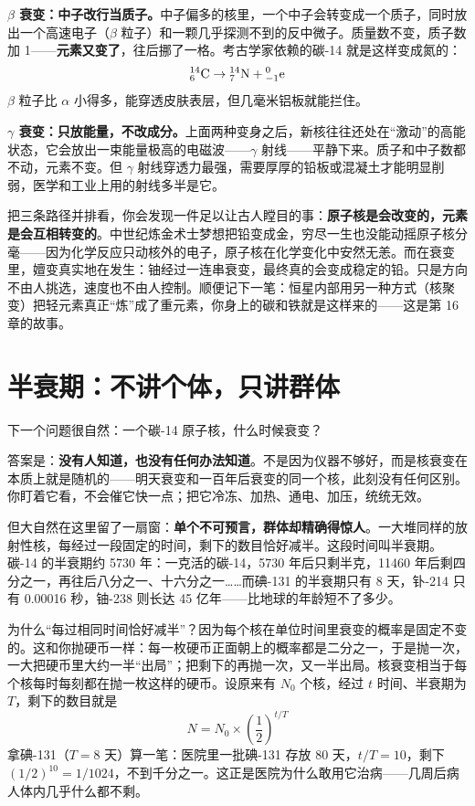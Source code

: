 \textbf{$\beta$ 衰变：中子改行当质子。}中子偏多的核里，一个中子会转变成一个质子，同时放出一个高速电子（$\beta$ 粒子）和一颗几乎探测不到的反中微子。质量数不变，质子数加 1——\textbf{元素又变了}，往后挪了一格。考古学家依赖的碳-14 就是这样变成氮的：
\[{}^{14}_{6}\mathrm{C} \rightarrow {}^{14}_{7}\mathrm{N} + {}^{0}_{-1}\mathrm{e}\]
$\beta$ 粒子比 $\alpha$ 小得多，能穿透皮肤表层，但几毫米铝板就能拦住。

\textbf{$\gamma$ 衰变：只放能量，不改成分。}上面两种变身之后，新核往往还处在“激动”的高能状态，它会放出一束能量极高的电磁波——$\gamma$ 射线——平静下来。质子和中子数都不动，元素不变。但 $\gamma$ 射线穿透力最强，需要厚厚的铅板或混凝土才能明显削弱，医学和工业上用的射线多半是它。

把三条路径并排看，你会发现一件足以让古人瞠目的事：\textbf{原子核是会改变的，元素是会互相转变的}。中世纪炼金术士梦想把铅变成金，穷尽一生也没能动摇原子核分毫——因为化学反应只动核外的电子，原子核在化学变化中安然无恙。而在衰变里，嬗变真实地在发生：铀经过一连串衰变，最终真的会变成稳定的铅。只是方向不由人挑选，速度也不由人控制。顺便记下一笔：恒星内部用另一种方式（核聚变）把轻元素真正“炼”成了重元素，你身上的碳和铁就是这样来的——这是第 16 章的故事。

\section{半衰期：不讲个体，只讲群体}

下一个问题很自然：一个碳-14 原子核，什么时候衰变？

答案是：\textbf{没有人知道，也没有任何办法知道}。不是因为仪器不够好，而是核衰变在本质上就是随机的——明天衰变和一百年后衰变的同一个核，此刻没有任何区别。你盯着它看，不会催它快一点；把它冷冻、加热、通电、加压，统统无效。

但大自然在这里留了一扇窗：\textbf{单个不可预言，群体却精确得惊人}。一大堆同样的放射性核，每经过一段固定的时间，剩下的数目恰好减半。这段时间叫半衰期。碳-14 的半衰期约 5730 年：一克活的碳-14，5730 年后只剩半克，11460 年后剩四分之一，再往后八分之一、十六分之一……而碘-131 的半衰期只有 8 天，钋-214 只有 0.00016 秒，铀-238 则长达 45 亿年——比地球的年龄短不了多少。

\begin{qiaoliang}
为什么“每过相同时间恰好减半”？因为每个核在单位时间里衰变的概率是固定不变的。这和你抛硬币一样：每一枚硬币正面朝上的概率都是二分之一，于是抛一次，一大把硬币里大约一半“出局”；把剩下的再抛一次，又一半出局。核衰变相当于每个核每时每刻都在抛一枚这样的硬币。设原来有 $N_0$ 个核，经过 $t$ 时间、半衰期为 $T$，剩下的数目就是
\[N = N_0 \times \left(\frac{1}{2}\right)^{t/T}\]
拿碘-131（$T=8$ 天）算一笔：医院里一批碘-131 存放 80 天，$t/T=10$，剩下 $(1/2)^{10}=1/1024$，不到千分之一。这正是医院为什么敢用它治病——几周后病人体内几乎什么都不剩。
\end{qiaoliang}

